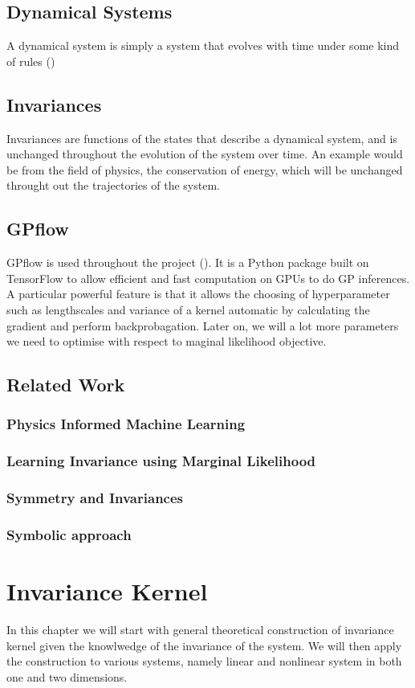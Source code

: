 \documentclass{statsmsc}
\begin{document}
\section{Dynamical Systems}
A dynamical system is simply a system that evolves with time under some kind of rules (\cite{alligood_sauer_yorke_2000})
\section{Invariances}
Invariances are functions of the states that describe a dynamical system, and is unchanged throughout the evolution of the system over time. 
An example would be from the field of physics, the conservation of energy, which will be unchanged throught out the trajectories of the system.
\section{GPflow}
GPflow is used throughout the project (\cite{GPflow2017}).
It is a Python package built on TensorFlow to allow efficient and fast computation on GPUs to do GP inferences.
A particular powerful feature is that it allows the choosing of hyperparameter such as lengthscales and variance of a kernel automatic by calculating the gradient and perform backprobagation.
Later on, we will a lot more parameters we need to optimise with respect to maginal likelihood objective.

\section{Related Work}
\subsection{Physics Informed Machine Learning}
\subsection{Learning Invariance using Marginal Likelihood}
\subsection{Symmetry and Invariances}
\subsection{Symbolic approach}



\chapter{Invariance Kernel}
In this chapter we will start with general theoretical construction of invariance kernel given the knowlwedge of the invariance of the system.
We will then apply the construction to various systems, namely linear and nonlinear system in both one and two dimensions.
\end{document}
